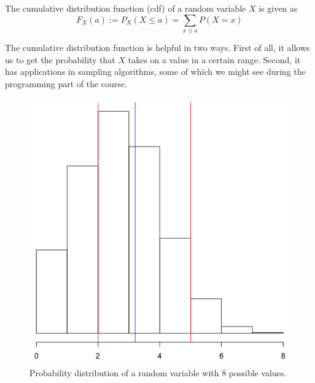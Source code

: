 \documentclass[a4paper,11pt,leqno]{report}
\begin{document}
\newpage
\begin{Definition}
The cumulative distribution function (cdf) of a random variable $ X $ is given as
$$ F_{X}(a) := P_{X}(X \leq a) = {\underset{x \leq a}{\sum}}P(X=x) $$
\end{Definition}

The cumulative distribution function is helpful in two ways. First of all, it allows us to get the probability that
$ X $ takes on a value in a certain range. Second, it has applications in sampling algorithms, some of which we might
see during the programming part of the course.

\begin{figure}
\center
\includegraphics[scale=.3]{histogram.png}
\caption{Probability distribution of a random variable with $ 8 $ possible values.}
\label{binomplot}
\end{figure}
\end{document}
